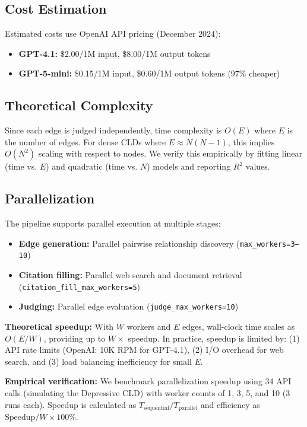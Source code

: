 \subsection{Cost Estimation}
Estimated costs use OpenAI API pricing (December 2024):
\begin{itemize}[noitemsep]
    \item \textbf{GPT-4.1:} \$2.00/1M input, \$8.00/1M output tokens
    \item \textbf{GPT-5-mini:} \$0.15/1M input, \$0.60/1M output tokens (97\% cheaper)
\end{itemize}

\subsection{Theoretical Complexity}
Since each edge is judged independently, time complexity is $O(E)$ where $E$ is the number of edges. For dense CLDs where $E \approx N(N-1)$, this implies $O(N^2)$ scaling with respect to nodes. We verify this empirically by fitting linear (time vs. $E$) and quadratic (time vs. $N$) models and reporting $R^2$ values.

\subsection{Parallelization}
The pipeline supports parallel execution at multiple stages:
\begin{itemize}[noitemsep]
    \item \textbf{Edge generation:} Parallel pairwise relationship discovery (\texttt{max\_workers=3--10})
    \item \textbf{Citation filling:} Parallel web search and document retrieval (\texttt{citation\_fill\_max\_workers=5})
    \item \textbf{Judging:} Parallel edge evaluation (\texttt{judge\_max\_workers=10})
\end{itemize}

\textbf{Theoretical speedup:} With $W$ workers and $E$ edges, wall-clock time scales as $O(E/W)$, providing up to $W\times$ speedup. In practice, speedup is limited by: (1) API rate limits (OpenAI: 10K RPM for GPT-4.1), (2) I/O overhead for web search, and (3) load balancing inefficiency for small $E$.

\textbf{Empirical verification:} We benchmark parallelization speedup using 34 API calls (simulating the Depressive CLD) with worker counts of 1, 3, 5, and 10 (3 runs each). Speedup is calculated as $T_{\text{sequential}} / T_{\text{parallel}}$ and efficiency as $\text{Speedup} / W \times 100\%$.

